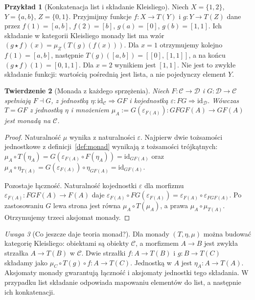 \documentclass[11pt,a4paper]{article}
\numberwithin{equation}{section}
\theoremstyle{plain}
\newtheorem{twierdzenie}{Twierdzenie}[section]
\theoremstyle{definition}
\newtheorem{przyklad}[twierdzenie]{Przykład}
\theoremstyle{remark}
\newtheorem{uwaga}[twierdzenie]{Uwaga}
\newcommand{\id}{\mathrm{id}}
\begin{document}
\begin{przyklad}[Konkatenacja list i składanie Kleisliego]
Niech $X=\{1,2\}$, $Y=\{a,b\}$, $Z=\{0,1\}$. Przyjmijmy funkcje $f:X\to T(Y)$ i $g:Y\to T(Z)$ dane przez
$f(1)=[a,b]$, $f(2)=[b]$, $g(a)=[0]$, $g(b)=[1,1]$.
Ich składanie w kategorii Kleisliego monady list ma wzór $(g\star f)(x)=\mu_Z(T(g)(f(x)))$. Dla $x=1$ otrzymujemy kolejno $f(1)=[a,b]$, następnie $T(g)([a,b])=[[0],[1,1]]$, a na końcu $(g\star f)(1)=[0,1,1]$. Dla $x=2$ wynikiem jest $[1,1]$. Nie jest to zwykłe składanie funkcji: wartością pośrednią jest lista, a nie pojedynczy element $Y$.
\end{przyklad}


\begin{twierdzenie}[Monada z każdego sprzężenia]
Niech $F:\mathcal C\to\mathcal D$ i $G:\mathcal D\to\mathcal C$ spełniają $F\dashv G$, z jednostką $\eta:\id_{\mathcal C}\Rightarrow GF$ i kojednostką $\varepsilon:FG\Rightarrow\id_{\mathcal D}$. Wówczas $T=GF$ z jednostką $\eta$ i mnożeniem $\mu_A:=G(\varepsilon_{F(A)}):GFGF(A)\to GF(A)$ jest monadą na $\mathcal C$.
\end{twierdzenie}
\begin{proof}
Naturalność $\mu$ wynika z naturalności $\varepsilon$. Najpierw dwie tożsamości jednostkowe z definicji~\ref{def:monad} wynikają z tożsamości trójkątnych:
$\mu_A\circ T(\eta_A)=G(\varepsilon_{F(A)}\circ F(\eta_A))=\id_{GF(A)}$ oraz
$\mu_A\circ\eta_{T(A)}=G(\varepsilon_{F(A)})\circ\eta_{GF(A)}=\id_{GF(A)}$.

Pozostaje łączność. Naturalność kojednostki $\varepsilon$ dla morfizmu $\varepsilon_{F(A)}:FGF(A)\to F(A)$ daje
$\varepsilon_{F(A)}\circ FG(\varepsilon_{F(A)})=\varepsilon_{F(A)}\circ\varepsilon_{FGF(A)}$. Po zastosowaniu $G$ lewa strona jest równa $\mu_A\circ T(\mu_A)$, a prawa $\mu_A\circ\mu_{T(A)}$. Otrzymujemy trzeci aksjomat monady.
\end{proof}

\begin{uwaga}[Co jeszcze daje teoria monad?]
Dla monady $(T,\eta,\mu)$ można budować kategorię Kleisliego: obiektami są obiekty $\mathcal C$, a morfizmem $A\to B$ jest zwykła strzałka $A\to T(B)$ w $\mathcal C$. Dwie strzałki $f:A\to T(B)$ i $g:B\to T(C)$ składamy jako $\mu_C\circ T(g)\circ f:A\to T(C)$. Jednostką w $A$ jest $\eta_A:A\to T(A)$. Aksjomaty monady gwarantują łączność i aksjomaty jednostki tego składania. W przypadku list składanie odpowiada mapowaniu elementów do list, a następnie ich konkatenacji.
\end{uwaga}
\end{document}
